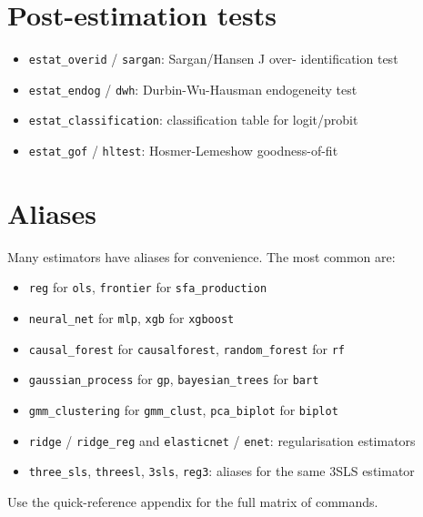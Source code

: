 \section{Post-estimation tests}

\begin{itemize}
\item \texttt{estat\_overid} / \texttt{sargan}: Sargan/Hansen J over-
      identification test
\item \texttt{estat\_endog} / \texttt{dwh}: Durbin-Wu-Hausman endogeneity test
\item \texttt{estat\_classification}: classification table for logit/probit
\item \texttt{estat\_gof} / \texttt{hltest}: Hosmer-Lemeshow goodness-of-fit
\end{itemize}

\section{Aliases}

Many estimators have aliases for convenience. The most common are:

\begin{itemize}
\item \texttt{reg} for \texttt{ols}, \texttt{frontier} for \texttt{sfa\_production}
\item \texttt{neural\_net} for \texttt{mlp}, \texttt{xgb} for \texttt{xgboost}
\item \texttt{causal\_forest} for \texttt{causalforest}, \texttt{random\_forest} for \texttt{rf}
\item \texttt{gaussian\_process} for \texttt{gp}, \texttt{bayesian\_trees} for \texttt{bart}
\item \texttt{gmm\_clustering} for \texttt{gmm\_clust}, \texttt{pca\_biplot} for \texttt{biplot}
\item \texttt{ridge} / \texttt{ridge\_reg} and \texttt{elasticnet} / \texttt{enet}: regularisation estimators
\item \texttt{three\_sls}, \texttt{threesl}, \texttt{3sls}, \texttt{reg3}: aliases for the
      same 3SLS estimator
\end{itemize}

Use the quick-reference appendix for the full matrix of commands.
